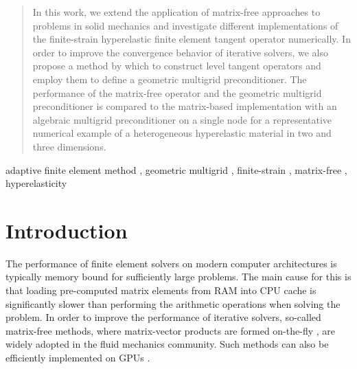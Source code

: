 \documentclass[times,doublespace]{nmeauth}
\begin{document}
\begin{frontmatter}
\begin{abstract}
    In this work, we extend the application of matrix-free approaches to problems in solid mechanics and investigate different implementations of the finite-strain hyperelastic finite element tangent operator numerically.
    In order to improve the convergence behavior of iterative solvers, we also propose a method by which to construct level tangent operators
    and employ them to define a geometric multigrid preconditioner.
    The performance of the matrix-free operator and the geometric multigrid preconditioner is compared to the matrix-based implementation with an algebraic multigrid preconditioner {\color{red} on a single node} for a representative numerical example of a heterogeneous hyperelastic material in two and three dimensions.
  \end{abstract}

\ifijnme


  \maketitle

\else
    \begin{keyword}
        adaptive finite element method \sep
        geometric multigrid \sep
        finite-strain \sep
        matrix-free \sep
        hyperelasticity
    \end{keyword}

\end{frontmatter}
\fi

\section{Introduction}

The performance of finite element solvers on modern computer architectures is typically memory bound {\color{red} for sufficiently large problems}.
The main cause for this is that loading pre-computed matrix elements from RAM into CPU cache is significantly slower than performing the arithmetic operations when solving the problem.
In order to improve the performance of iterative solvers, so-called matrix-free methods,
where matrix-vector products are formed on-the-fly \cite{kronbichler12,May2015, Krank2017, Brown2010, Gmeiner2016},
are widely adopted in the fluid mechanics community.
Such methods can also be efficiently implemented on GPUs \cite{Abdelfattah2016, ljungkvist2017multigrid}.
\end{document}
